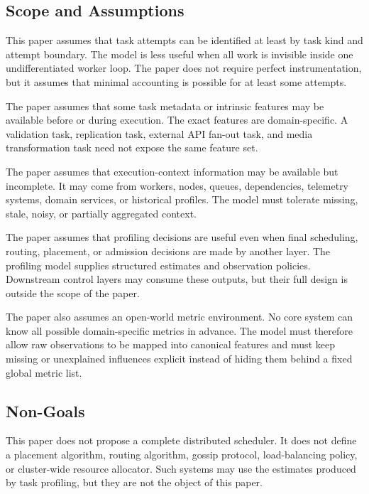 \subsection{Scope and Assumptions}
\label{sec:problem-scope-assumptions}

This paper assumes that task attempts can be identified at least by task kind
and attempt boundary. The model is less useful when all work is invisible inside
one undifferentiated worker loop. The paper does not require perfect
instrumentation, but it assumes that minimal accounting is possible for at least
some attempts.

The paper assumes that some task metadata or intrinsic features may be available
before or during execution. The exact features are domain-specific. A validation
task, replication task, external API fan-out task, and media transformation task
need not expose the same feature set.

The paper assumes that execution-context information may be available but
incomplete. It may come from workers, nodes, queues, dependencies, telemetry
systems, domain services, or historical profiles. The model must tolerate
missing, stale, noisy, or partially aggregated context.

The paper assumes that profiling decisions are useful even when final
scheduling, routing, placement, or admission decisions are made by another layer.
The profiling model supplies structured estimates and observation policies.
Downstream control layers may consume these outputs, but their full design is
outside the scope of the paper.

The paper also assumes an open-world metric environment. No core system can know
all possible domain-specific metrics in advance. The model must therefore allow
raw observations to be mapped into canonical features and must keep missing or
unexplained influences explicit instead of hiding them behind a fixed global
metric list.

\subsection{Non-Goals}
\label{sec:problem-non-goals}

This paper does not propose a complete distributed scheduler. It does not define
a placement algorithm, routing algorithm, gossip protocol, load-balancing policy,
or cluster-wide resource allocator. Such systems may use the estimates produced
by task profiling, but they are not the object of this paper.

